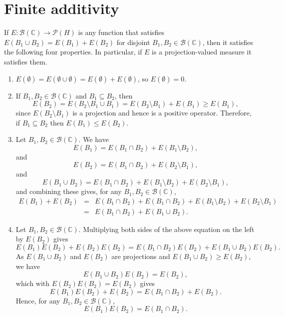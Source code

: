 \documentclass{article}
\begin{document}
\section{Finite additivity}
\label{properties}
If $E:\mathscr{B}(\mathbb{C}) \to \mathscr{P}(H)$ is any function that satisfies
$E(B_1 \cup B_2)=E(B_1)+E(B_2)$ for disjoint $B_1, B_2 \in \mathscr{B}(\mathbb{C})$, then it satisfies the following
four properties. In particular, if $E$ is a projection-valued measure it satisfies them.

\begin{enumerate}
\item $E(\emptyset)=E(\emptyset \cup \emptyset)=E(\emptyset)+E(\emptyset)$, so $E(\emptyset)=0$.

\item  If $B_1,B_2 \in \mathscr{B}(\mathbb{C})$ and $B_1 \subseteq B_2$, then
\[
E(B_2)=E(B_2 \setminus B_1 \cup B_1)=E(B_2 \setminus B_1)+E(B_1) \geq E(B_1),
\]
since $E(B_2 \setminus B_1)$ is a projection and hence is a positive operator. Therefore, if $B_1 \subseteq B_2$ then
$E(B_1) \leq E(B_2)$. 

\item Let $B_1, B_2 \in \mathscr{B}(\mathbb{C})$. We have
\[
E(B_1)=E(B_1 \cap B_2)+E(B_1 \setminus B_2),
\]
and
\[
E(B_2)=E(B_1 \cap B_2)+E(B_2 \setminus B_1),
\]
and
\[
E(B_1 \cup B_2)=E(B_1 \cap B_2) + E(B_1 \setminus B_2) + E(B_2 \setminus B_1), 
\]
and combining these gives, for any $B_1, B_2 \in \mathscr{B}(\mathbb{C})$,
\begin{eqnarray*}
E(B_1)+E(B_2)&=&E(B_1 \cap B_2)+E(B_1 \cap B_2)+E(B_1 \setminus B_2)+E(B_2 \setminus B_1)\\
&=&E(B_1 \cap B_2)+E(B_1 \cup B_2).
\end{eqnarray*}

\item Let $B_1,B_2 \in \mathscr{B}(\mathbb{C})$. Multiplying both sides of the above equation on the left by $E(B_2)$ gives
\[
E(B_1)E(B_2)+E(B_2)E(B_2)=E(B_1 \cap B_2)E(B_2)+E(B_1 \cup B_2) E(B_2).
\]
As $E(B_1 \cup B_2)$ and $E(B_2)$ are projections and $E(B_1 \cup B_2) \geq E(B_2)$, we have
\[
E(B_1 \cup B_2) E(B_2)=E(B_2),
\]
which with $E(B_2)E(B_2)=E(B_2)$ gives
\[
E(B_1)E(B_2)+E(B_2)=E(B_1 \cap B_2)+E(B_2).
\]
Hence, for any $B_1, B_2 \in \mathscr{B}(\mathbb{C})$,
\[
E(B_1)E(B_2)=E(B_1 \cap B_2).
\]
\end{enumerate}
\end{document}
